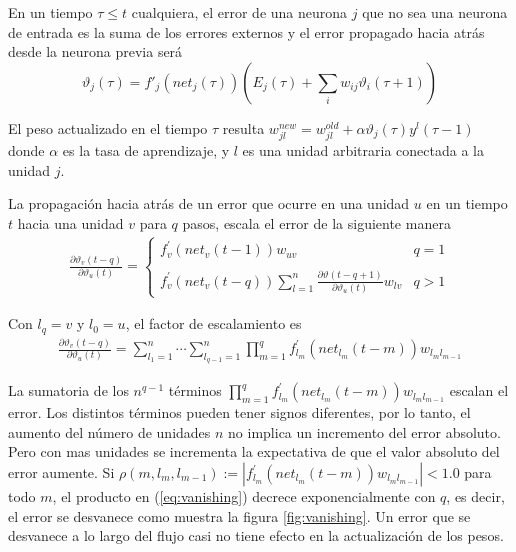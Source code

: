 En un tiempo $\tau \leq t$ cualquiera, el error de una neurona $j$ que no sea una neurona de entrada es la suma de los errores externos y el error propagado hacia atrás desde la neurona previa será
$$ \vartheta_{j}(\tau) = f'_{j}(net_{j}(\tau))\left(E_{j}(\tau) + \sum_{i} w_{ij}\vartheta_{i}(\tau + 1)\right) $$

El peso actualizado en el tiempo $\tau$ resulta $w_{jl}^{new} = w_{jl}^{old} + \alpha\vartheta_{j}(\tau) y^{l}(\tau - 1)$ donde $\alpha$ es la tasa de aprendizaje, y $l$ es una unidad arbitraria conectada a la unidad $j$.

La propagación hacia atrás de un error que ocurre en una unidad $u$ en un tiempo $t$ hacia una unidad $v$ para $q$ pasos, escala el error de la siguiente manera
\begin{eqnarray}
\frac{\partial\vartheta_{v}(t - q)}{\partial\vartheta_{u}(t)} =
\left\{
\begin{array}{lr}
	f^{'}_{v}(net_{v}(t - 1))w_{uv}	& q = 1\\
	\\
	f^{'}_{v}(net_{v}(t - q))\sum^{n}_{l=1}\frac{\partial\vartheta(t - q + 1)}{\partial\vartheta_{u}(t)}w_{lv}	& q > 1
\end{array}
\right.
\end{eqnarray}

Con $l_{q} = v$ y $l_{0} = u$, el factor de escalamiento es
\begin{eqnarray}
\frac{\partial\vartheta_{v}(t - q)}{\partial\vartheta_{u}(t)} =
\sum^{n}_{l_{1}=1}\cdots\sum^{n}_{l_{q - 1}=1}\prod^{q}_{m = 1}f^{'}_{l_{m}}(net_{l_{m}}(t - m))w_{l_{m}l_{m - 1}}\label{eq:vanishing}
\end{eqnarray}

La sumatoria de los $n^{q - 1}$ términos $\prod^{q}_{m = 1}f^{'}_{l_{m}}(net_{l_{m}}(t - m))w_{l_{m}l_{m - 1}}$ escalan el error. Los distintos términos pueden tener signos diferentes, por lo tanto, el aumento del número de unidades $n$ no implica un incremento del error absoluto. Pero con mas unidades se incrementa la expectativa de que el valor absoluto del error aumente. Si $\rho(m, l_{m}, l_{m - 1}) := |f^{'}_{l_{m}}(net_{l_{m}}(t - m))w_{l_{m}l_{m - 1}}| < 1.0$
para todo $m$, el producto en (\ref{eq:vanishing}) decrece exponencialmente con $q$, es decir, el error se desvanece como muestra la figura \ref{fig:vanishing}. Un error que se desvanece a lo largo del flujo casi no tiene efecto en la actualización de los pesos. %

